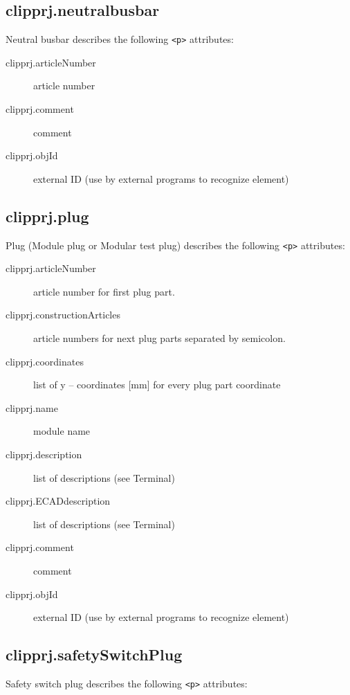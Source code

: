 \documentclass[%
	a4paper,
	oneside,
	listof=numbered,
	parskip=half,
	headsepline=true,
	footsepline=false,
	normalheadings,
	0.7headlines,
	headexclude,
	]{scrbook}
\begin{document}
\subsection{clipprj.neutralbusbar}
 
Neutral busbar describes the following \verb|<p>| attributes: 

\begin{description}
	\item[clipprj.articleNumber] article number 
	\item[clipprj.comment] comment 
	\item[clipprj.objId] external ID (use by external programs to recognize element) 
\end{description}

\subsection{clipprj.plug}
 
Plug (Module plug or Modular test plug) describes the following \verb|<p>| attributes: 

\begin{description}
	\item[clipprj.articleNumber] article number for first plug part. 
	\item[clipprj.constructionArticles] article numbers for next plug parts separated by semicolon. 
	\item[clipprj.coordinates] list of y – coordinates [mm] for every plug part coordinate
	\item[clipprj.name] module name 
	\item[clipprj.description] list of descriptions (see Terminal) 
	\item[clipprj.ECADdescription] list of descriptions (see Terminal) 
	\item[clipprj.comment] comment 
	\item[clipprj.objId] external ID (use by external programs to recognize element) 
\end{description}

\subsection{clipprj.safetySwitchPlug}
 
Safety switch plug describes the following \verb|<p>| attributes: 
\end{document}
